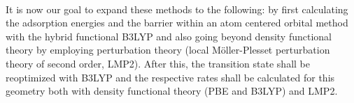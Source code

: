 \documentclass[11pt,DIV=13,BCOR=5mm,a4paper,headinclude]{scrbook}
\begin{document}
\\
It is now our goal to expand these methods to the following: by first calculating the adsorption energies and the barrier within an atom centered orbital method with the hybrid functional B3LYP and also going beyond density functional theory by employing perturbation theory (local M\"{o}ller-Plesset perturbation theory of second order, LMP2).
After this, the transition state shall be reoptimized with B3LYP and the respective rates shall be calculated for this geometry both with density functional theory (PBE and B3LYP) and LMP2.

\end{document}
